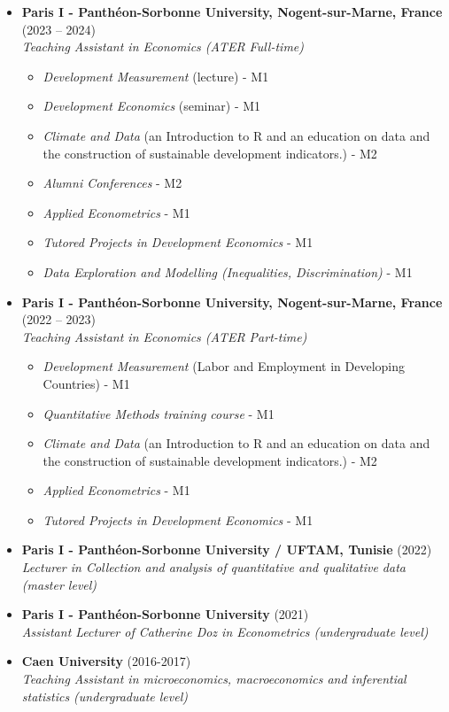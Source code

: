 \documentclass[
]{article}
\providecommand{\tightlist}{%
  \setlength{\itemsep}{0pt}\setlength{\parskip}{0pt}}
\begin{document}
\begin{itemize}
\item
  \textbf{Paris I - Panthéon-Sorbonne University, Nogent-sur-Marne,
  France} (2023 -- 2024)\\
  \emph{Teaching Assistant in Economics (ATER Full-time)}

  \begin{itemize}
  \tightlist
  \item
    \emph{Development Measurement} (lecture) - M1
  \item
    \emph{Development Economics} (seminar) - M1
  \item
    \emph{Climate and Data} (an Introduction to R and an education on
    data and the construction of sustainable development indicators.) -
    M2
  \item
    \emph{Alumni Conferences} - M2
  \item
    \emph{Applied Econometrics} - M1
  \item
    \emph{Tutored Projects in Development Economics} - M1
  \item
    \emph{Data Exploration and Modelling (Inequalities, Discrimination)}
    - M1
  \end{itemize}
\item
  \textbf{Paris I - Panthéon-Sorbonne University, Nogent-sur-Marne,
  France} (2022 -- 2023)\\
  \emph{Teaching Assistant in Economics (ATER Part-time)}

  \begin{itemize}
  \tightlist
  \item
    \emph{Development Measurement} (Labor and Employment in Developing
    Countries) - M1
  \item
    \emph{Quantitative Methods training course} - M1
  \item
    \emph{Climate and Data} (an Introduction to R and an education on
    data and the construction of sustainable development indicators.) -
    M2
  \item
    \emph{Applied Econometrics} - M1
  \item
    \emph{Tutored Projects in Development Economics} - M1
  \end{itemize}
\item
  \textbf{Paris I - Panthéon-Sorbonne University / UFTAM, Tunisie}
  (2022)\\
  \emph{Lecturer in Collection and analysis of quantitative and
  qualitative data (master level)}
\item
  \textbf{Paris I - Panthéon-Sorbonne University} (2021)\\
  \emph{Assistant Lecturer of Catherine Doz in Econometrics
  (undergraduate level)}
\item
  \textbf{Caen University} (2016-2017)\\
  \emph{Teaching Assistant in microeconomics, macroeconomics and
  inferential statistics (undergraduate level)}
\end{itemize}
\end{document}
